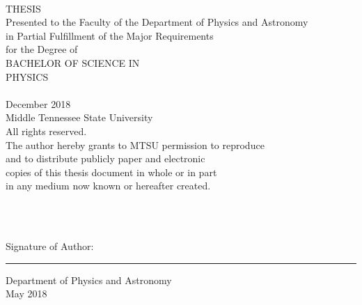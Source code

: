 \begin{titlepage}
    \begin{center}
        \fontsize{14pt}{16.8pt}\selectfont \theTitle\\
        \vspace{48pt}
        \fontsize{12pt}{14.4pt}\selectfont
        THESIS\\
        \vspace{60pt}
        Presented to the Faculty of the Department of Physics and Astronomy\\
        in Partial Fulfillment of the Major Requirements\\
        for the Degree of\\
        \vspace{36pt}
        BACHELOR OF SCIENCE IN\\
        PHYSICS\\
        \vspace{72pt}
        \theAuthor\\
        \vspace{60pt}
        December 2018\\
        \vspace{60pt}
         Middle Tennessee State University\\
        All rights reserved.\\
        \vspace{12pt}
        \fontsize{9pt}{10.8pt}\selectfont
        The author hereby grants to MTSU permission to reproduce\\
        and to distribute publicly paper and electronic\\
        copies of this thesis document in whole or in part\\
        in any medium now known or hereafter created.
    \end{center}
\end{titlepage}
\thispagestyle{empty}

\clearpage

\vspace*{24pt}
\begin{center}
    \fontsize{12pt}{14.4pt}\selectfont
    \theTitlecaps\\
    \vspace{24pt}
    \theAuthor\\
    \vspace{216pt}
\end{center}
\begin{flushleft}
    Signature of Author:
    \vspace{4pt}\hrule\vspace{4pt}
    \raggedleft
    \fontsize{10pt}{12pt}\selectfont
    Department of Physics and Astronomy\\
    May 2018\\
\end{flushleft}
\vspace{36pt}

